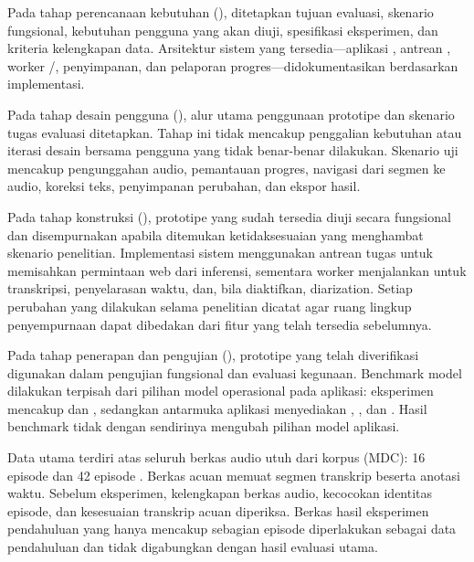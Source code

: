 Pada tahap perencanaan kebutuhan (), ditetapkan tujuan evaluasi, skenario fungsional, kebutuhan pengguna yang akan diuji, spesifikasi eksperimen, dan kriteria kelengkapan data. Arsitektur sistem yang tersedia—aplikasi , antrean , worker /, penyimpanan, dan pelaporan progres—didokumentasikan berdasarkan implementasi.

Pada tahap desain pengguna (), alur utama penggunaan prototipe dan skenario tugas evaluasi ditetapkan. Tahap ini tidak mencakup penggalian kebutuhan atau iterasi desain bersama pengguna yang tidak benar-benar dilakukan. Skenario uji mencakup pengunggahan audio, pemantauan progres, navigasi dari segmen ke audio, koreksi teks, penyimpanan perubahan, dan ekspor hasil.

Pada tahap konstruksi (), prototipe yang sudah tersedia diuji secara fungsional dan disempurnakan apabila ditemukan ketidaksesuaian yang menghambat skenario penelitian. Implementasi sistem menggunakan antrean tugas untuk memisahkan permintaan web dari inferensi, sementara worker menjalankan  untuk transkripsi, penyelarasan waktu, dan, bila diaktifkan, diarization. Setiap perubahan yang dilakukan selama penelitian dicatat agar ruang lingkup penyempurnaan dapat dibedakan dari fitur yang telah tersedia sebelumnya.

Pada tahap penerapan dan pengujian (), prototipe yang telah diverifikasi digunakan dalam pengujian fungsional dan evaluasi kegunaan. Benchmark model dilakukan terpisah dari pilihan model operasional pada aplikasi: eksperimen mencakup  dan , sedangkan antarmuka aplikasi menyediakan , , dan . Hasil benchmark tidak dengan sendirinya mengubah pilihan model aplikasi.

Data utama terdiri atas seluruh \totalberkasaudio{} berkas audio utuh dari korpus  (MDC): 16 episode  dan 42 episode . Berkas  acuan memuat \totalsegmentranskrip{} segmen transkrip beserta anotasi waktu. Sebelum eksperimen, kelengkapan berkas audio, kecocokan identitas episode, dan kesesuaian transkrip acuan diperiksa. Berkas hasil eksperimen pendahuluan yang hanya mencakup sebagian episode diperlakukan sebagai data pendahuluan dan tidak digabungkan dengan hasil evaluasi utama.

